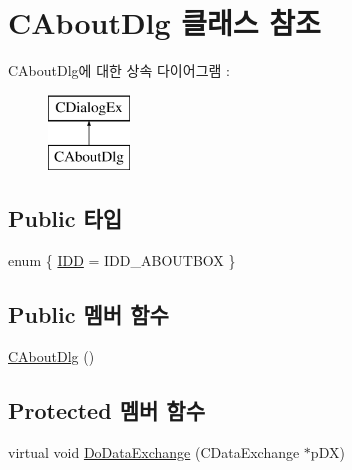 \hypertarget{class_c_about_dlg}{\section{C\-About\-Dlg 클래스 참조}
\label{class_c_about_dlg}
}
C\-About\-Dlg에 대한 상속 다이어그램 \-: \begin{figure}[H]
\begin{center}
\leavevmode
\includegraphics[height=2.000000cm]{class_c_about_dlg}
\end{center}
\end{figure}
\subsection*{Public 타입}
\begin{DoxyCompactItemize}
\item 
enum \{ \hyperlink{class_c_about_dlg_ab29e21bead9ca10b63b4628e8f8e4325ab6703c7538518b2b788243189e9f7981}{I\-D\-D} = I\-D\-D\-\_\-\-A\-B\-O\-U\-T\-B\-O\-X
 \}
\end{DoxyCompactItemize}
\subsection*{Public 멤버 함수}
\begin{DoxyCompactItemize}
\item 
\hyperlink{class_c_about_dlg_a6d1e6a33fef23bee6e75254189d865ce}{C\-About\-Dlg} ()
\end{DoxyCompactItemize}
\subsection*{Protected 멤버 함수}
\begin{DoxyCompactItemize}
\item 
virtual void \hyperlink{class_c_about_dlg_ab83db7484fec957282d7d5a21aed4df4}{Do\-Data\-Exchange} (C\-Data\-Exchange $\ast$p\-D\-X)
\end{DoxyCompactItemize}


